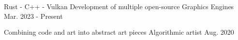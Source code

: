 

\begin{cventries}

  \cventry
    {Rust - C++ - Vulkan} %
    {Development of multiple open-source Graphics Engines} %
    {} %
    {Mar. 2023 - Present} %

  \cventry
    {Combining code and art into abstract art pieces} %
    {Algorithmic artist} %
    {} %
    {Aug. 2020} %

\end{cventries}
